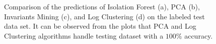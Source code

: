 \begin{figure}%
    \centering
    \qquad
    \qquad
    \qquad
    \caption{Comparison of the predictions of Isolation Forest (a), PCA (b), Invariants Mining (c), and Log Clustering (d) on the labeled test data set. It can be observed from the plots that PCA and Log Clustering algorithms handle testing dataset with a $100 \%$ accuracy.}%
    \label{fig:tsne-predictions-labeled}%
\end{figure}



